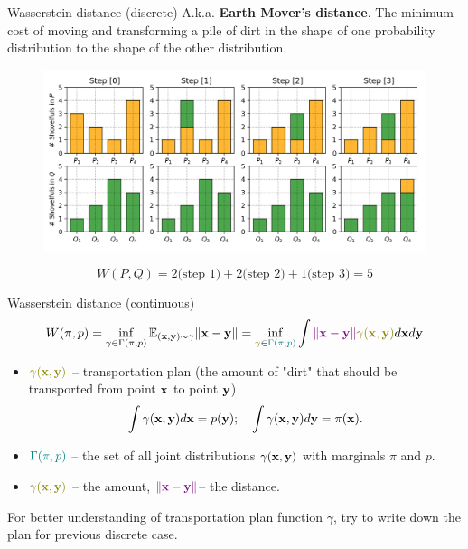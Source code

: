 \begin{frame}{Wasserstein distance (discrete)}
	A.k.a. \textbf{Earth Mover's distance}.
	The minimum cost of moving and transforming a pile of dirt in the shape of one probability distribution to the shape of the other distribution.
	\begin{figure}
		\centering
		\includegraphics[width=.9\linewidth]{figs/EM_distance_discrete}
	\end{figure}
	\[
		W(P, Q) = 2 \text{(step 1)} + 2 \text{(step 2)} + 1 \text{(step 3)}  = 5
	\]
	
\end{frame}
\begin{frame}{Wasserstein distance (continuous)}
	\[
		W(\pi, p) = \inf_{\gamma \in \Gamma(\pi, p)} \bbE_{(\bx, \by) \sim \gamma} \| \bx - \by \| =  \inf_{{\color{olive}\gamma}\in {\color{teal}\Gamma(\pi, p)}} \int {\color{violet} \| \bx - \by \|} {\color{olive}\gamma (\bx, \by)} d \bx d \by
	\]
	\begin{itemize}
		\item ${\color{olive}\gamma (\bx, \by)}$ -- transportation plan (the amount of "dirt" that should be transported from point $\mathbf{x}$ to point $\mathbf{y}$)
		\[
			 \int \gamma(\mathbf{x}, \mathbf{y}) d \mathbf{x} = p(\mathbf{y}); \quad \int \gamma(\mathbf{x}, \mathbf{y}) d \mathbf{y} = \pi(\mathbf{x}).
		\]
		\item ${\color{teal}\Gamma(\pi, p)}$ -- the set of all joint distributions $\gamma (\mathbf{x}, \mathbf{y})$ with marginals $\pi$ and $p$.
		\item ${\color{olive}\gamma(\bx, \by)}$ -- the amount, ${\color{violet} \| \mathbf{x} - \mathbf{y} \|}$-- the distance.
	\end{itemize}
	{\color{gray}For better understanding of transportation plan function $\gamma$, try to write down the plan for previous discrete case.}
\end{frame}
